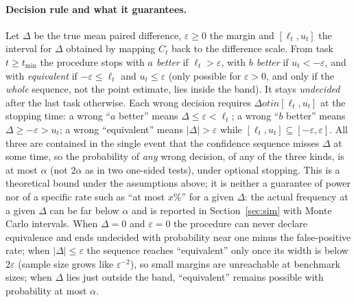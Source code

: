 \paragraph{Decision rule and what it guarantees.} Let $\Delta$ be the true mean paired difference, $\varepsilon\ge0$ the margin and $[\ell_t,u_t]$ the interval for $\Delta$ obtained by mapping $C_t$ back to the difference scale. From task $t\ge t_{\min}$ the procedure stops with \emph{$a$ better} if $\ell_t>\varepsilon$, with \emph{$b$ better} if $u_t<-\varepsilon$, and with \emph{equivalent} if $-\varepsilon\le\ell_t$ and $u_t\le\varepsilon$ (only possible for $\varepsilon>0$, and only if the \emph{whole} sequence, not the point estimate, lies inside the band). It stays \emph{undecided} after the last task otherwise. Each wrong decision requires $\Delta
otin[\ell_t,u_t]$ at the stopping time: a wrong ``$a$ better'' means $\Delta\le\varepsilon<\ell_t$; a wrong ``$b$ better'' means $\Delta\ge-\varepsilon>u_t$; a wrong ``equivalent'' means $|\Delta|>\varepsilon$ while $[\ell_t,u_t]\subseteq[-\varepsilon,\varepsilon]$. All three are contained in the single event that the confidence sequence misses $\Delta$ at some time, so the probability of \emph{any} wrong decision, of any of the three kinds, is at most $\alpha$ (not $2\alpha$ as in two one-sided tests), under optional stopping. This is a theoretical bound under the assumptions above; it is neither a guarantee of power nor of a specific rate such as ``at most $x\%$'' for a given $\Delta$: the actual frequency at a given $\Delta$ can be far below $\alpha$ and is reported in Section~\ref{sec:sim} with Monte Carlo intervals. When $\Delta=0$ and $\varepsilon=0$ the procedure can never declare equivalence and ends undecided with probability near one minus the false-positive rate; when $|\Delta|\le\varepsilon$ the sequence reaches ``equivalent'' only once its width is below $2\varepsilon$ (sample size grows like $\varepsilon^{-2}$), so small margins are unreachable at benchmark sizes; when $\Delta$ lies just outside the band, ``equivalent'' remains possible with probability at most $\alpha$.
